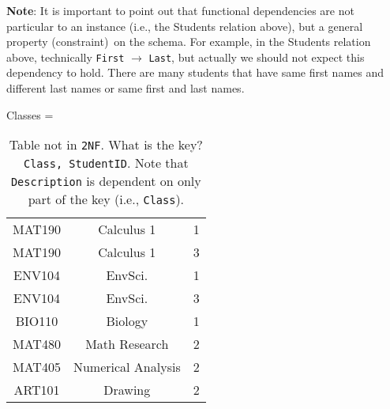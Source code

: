 \documentclass{article}
\begin{document}
\noindent \textbf{Note}: It is important to point out that functional dependencies are not particular to an instance (i.e., the Students relation above), but a general property (constraint)\ on the schema.  For example, in the Students relation above, technically \texttt{First} $\to$ \texttt{Last}, but actually we should not expect this dependency to hold.  There are many students that have same first names and different last names or same first and last names.   

 

\begin{table}[h!]
\caption{Table not in \texttt{2NF}.  What is the key? \texttt{Class, StudentID}.   Note that \texttt{Description} is dependent on only part of the key (i.e., \texttt{Class}).   
   }
\begin{center}

Classes = \begin{tabular}{|c|c|c|}
   \hline
  \cellcolor{excel}{Class}  & \cellcolor{excel}{Description} & \cellcolor{excel}{StudentID}
  \\
  \hline
  MAT190 & Calculus 1 & 1  \\
      \hline
 MAT190 & Calculus 1 & 3  \\
      \hline
 
 ENV104 & EnvSci. & 1  \\
      \hline
      
      
 ENV104 & EnvSci. & 3  \\
      \hline
 


BIO110 & Biology & 1  \\
      \hline
      
 MAT480 & Math Research & 2  \\
      \hline
      
 MAT405 & Numerical Analysis & 2  \\
      \hline
      
 ART101 & Drawing & 2  \\
      \hline
\end{tabular}
\end{center}
\label{tab:2nf2}
\end{table}%
% 
% 
% 
% 
% 
 
 
 
 
 
 
\end{document}

